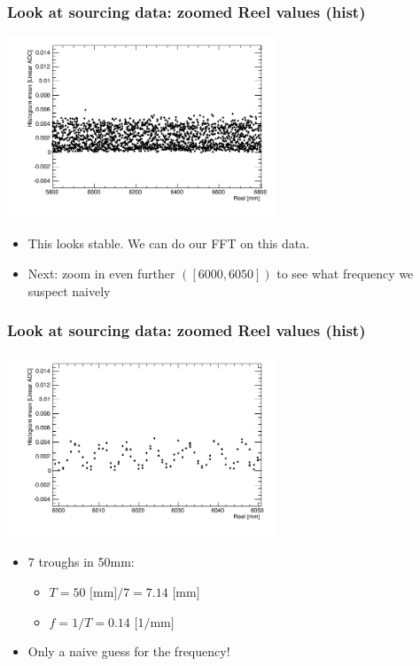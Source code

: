 \documentclass[bigger]{beamer}
\begin{document}
\begin{frame}
\frametitle{Look at sourcing data: zoomed Reel values (hist)}
\label{sec-3-1-3}
\label{sec-3-1-3-1}

\centering
\includegraphics[width=0.6\textwidth]{fig/sourcing_zoomed_plot.png}
\begin{itemize}

\item This looks stable.  We can do our FFT on this data.
\label{sec-3-1-3-2}%

\item Next: zoom in even further \(([6000,6050])\) to see what frequency we suspect naively
\label{sec-3-1-3-3}%
\end{itemize} %
\end{frame}
\begin{frame}
\frametitle{Look at sourcing data: zoomed Reel values (hist)}
\label{sec-3-1-4}
\label{sec-3-1-4-1}

\centering
\includegraphics[width=0.6\textwidth]{fig/sourcing_very_zoomed_plot.png}
\begin{itemize}

\item 7 troughs in 50mm:
\label{sec-3-1-4-2}%
\begin{itemize}

\item \(T = 50 \text{ [mm]}/ 7 = 7.14 \text{ [mm]} \)
\label{sec-3-1-4-2-1}%

\item \(f = 1/T = 0.14 \text{ [1/mm]}\)
\label{sec-3-1-4-2-2}%
\end{itemize} %

\item Only a naive guess for the frequency!
\label{sec-3-1-4-3}%
\end{itemize} %
\end{frame}
\end{document}
